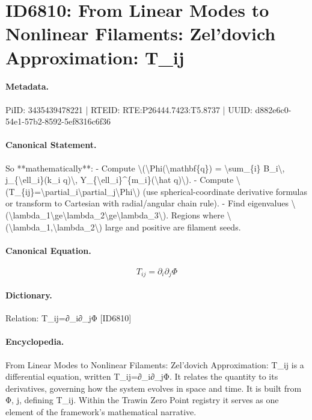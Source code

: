 \section*{ID6810: From Linear Modes to Nonlinear Filaments: Zel’dovich Approximation: T\_ij}
\paragraph{Metadata.}
PiID: 3435439478221 | RTEID: RTE:P26444.7423:T5.8737 | UUID: d882e6c0-54e1-57b2-8592-5ef8316c6f36

\paragraph{Canonical Statement.}
So **mathematically**: - Compute \textbackslash{}(\textbackslash{}Phi(\textbackslash{}mathbf\{q\}) = \textbackslash{}sum\_\{i\} B\_i\textbackslash{}, j\_\{\textbackslash{}ell\_i\}(k\_i q)\textbackslash{}, Y\_\{\textbackslash{}ell\_i\}\textasciicircum{}\{m\_i\}(\textbackslash{}hat q)\textbackslash{}). - Compute \textbackslash{}(T\_\{ij\}=\textbackslash{}partial\_i\textbackslash{}partial\_j\textbackslash{}Phi\textbackslash{}) (use spherical-coordinate derivative formulas or transform to Cartesian with radial/angular chain rule). - Find eigenvalues \textbackslash{}(\textbackslash{}lambda\_1\textbackslash{}ge\textbackslash{}lambda\_2\textbackslash{}ge\textbackslash{}lambda\_3\textbackslash{}). Regions where \textbackslash{}(\textbackslash{}lambda\_1,\textbackslash{}lambda\_2\textbackslash{}) large and positive are filament seeds.

\paragraph{Canonical Equation.}
\[
T_{ij}=\partial_i\partial_j\Phi
\]

\paragraph{Dictionary.}
Relation: T\_ij=∂\_i∂\_jΦ [ID6810]

\paragraph{Encyclopedia.}
From Linear Modes to Nonlinear Filaments: Zel’dovich Approximation: T\_ij is a differential equation, written T\_ij=∂\_i∂\_jΦ. It relates the quantity to its derivatives, governing how the system evolves in space and time. It is built from Φ, j, defining T\_ij. Within the Trawin Zero Point registry it serves as one element of the framework's mathematical narrative.
